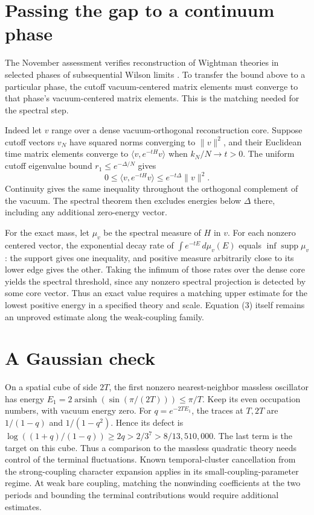 \documentclass[11pt]{amsart}
\begin{document}
\section{Passing the gap to a continuum phase}

The November assessment verifies reconstruction of Wightman theories
in selected phases of subsequential Wilson limits \cite[Theorem 6.1]{Assessment}.
To transfer the bound above to a particular phase, the cutoff
vacuum-centered matrix elements must converge to that phase's
vacuum-centered matrix elements. This is the matching needed for the
spectral step.

Indeed let \(v\) range over a dense vacuum-orthogonal reconstruction core.
Suppose cutoff vectors \(v_N\) have squared norms converging to
\(\|v\|^2\), and their Euclidean time matrix elements converge to
\(\langle v,e^{-tH}v\rangle\) when \(k_N/N\to t>0\).
The uniform cutoff eigenvalue bound \(r_1\le e^{-\Delta/N}\) gives
\[
0\le \langle v,e^{-tH}v\rangle\le e^{-t\Delta}\|v\|^2.
\]
Continuity gives the same inequality throughout the orthogonal complement
of the vacuum. The spectral theorem then excludes energies below
\(\Delta\) there, including any additional zero-energy vector.

For the exact mass, let \(\mu_v\) be the spectral measure of \(H\) in
\(v\). For each nonzero centered vector, the exponential decay rate of
\(\int e^{-tE}\,d\mu_v(E)\) equals \(\inf\operatorname{supp}\mu_v\):
the support gives one inequality, and positive measure arbitrarily
close to its lower edge gives the other. Taking the infimum of those
rates over the dense core yields the spectral threshold, since any
nonzero spectral projection is detected by some core vector. Thus an
exact value requires a matching upper estimate for the lowest positive
energy in a specified theory and scale. Equation (3) itself remains an
unproved estimate along the weak-coupling family.

\section{A Gaussian check}

On a spatial cube of side \(2T\), the first nonzero nearest-neighbor
massless oscillator has energy
\(E_1=2\operatorname{arsinh}(\sin(\pi/(2T)))\le\pi/T\).
Keep its even occupation numbers, with vacuum energy zero.
For \(q=e^{-2TE_1}\), the traces at \(T,2T\) are \(1/(1-q)\) and
\(1/(1-q^2)\). Hence its defect is
\(\log((1+q)/(1-q))\ge2q>2/3^7>8/13{,}510{,}000\).
The last term is the target on this cube. Thus a comparison to the
massless quadratic theory needs control of the terminal fluctuations.
Known temporal-cluster cancellation from the strong-coupling character
expansion \cite{LMP} applies in its small-coupling-parameter regime.
At weak bare coupling, matching the nonwinding coefficients at the
two periods and bounding the terminal contributions would require
additional estimates.
\end{document}
